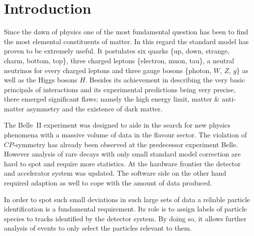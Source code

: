 \chapter{Introduction}
\label{chap:introduction}

Since the dawn of physics one of the most fundamental question has been to find the most elemental constituents of matter. In this regard the standard model has proven to be extremely useful. It postulates six quarks \{up, down, strange, charm, bottom, top\}, three charged leptons \{electron, muon, tau\}, a neutral neutrinos for every charged leptons and three gauge bosons \{photon, $W$, $Z$, $g$\} as well as the Higgs bosons $H$. Besides its achievement in describing the very basic principals of interactions and its experimental predictions being very precise, there emerged significant flaws; namely the high energy limit, matter \& anti-matter asymmetry and the existence of dark matter.

The Belle~\RN{2} experiment was designed to aide in the search for new physics phenomena with a massive volume of data in the flavour sector. The violation of $CP$-symmetry has already been observed at the predecessor experiment Belle. However analysis of rare decays with only small standard model correction are hard to spot and require more statistics. At the hardware frontier the detector and accelerator system was updated. The software side on the other hand required adaption as well to cope with the amount of data produced.

In order to spot such small deviations in such large sets of data a reliable particle identification is a fundamental requirement. Its role is to assign labels of particle species to tracks identified by the detector system. By doing so, it allows further analysis of events to only select the particles relevant to them.

